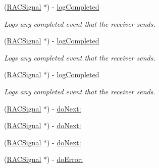 \begin{DoxyCompactItemize}
\mbox{\label{interface_r_a_c_signal_a1cacb34c4255d78ffdc38b38309112fe}} 
(\mbox{\hyperlink{interface_r_a_c_signal}{R\+A\+C\+Signal}} $\ast$) -\/ \mbox{\hyperlink{interface_r_a_c_signal_a1cacb34c4255d78ffdc38b38309112fe}{log\+Completed}}
\begin{DoxyCompactList}\small\item\em Logs any {\ttfamily completed} event that the receiver sends. \end{DoxyCompactList}\item 
\mbox{\label{interface_r_a_c_signal_a1cacb34c4255d78ffdc38b38309112fe}} 
(\mbox{\hyperlink{interface_r_a_c_signal}{R\+A\+C\+Signal}} $\ast$) -\/ \mbox{\hyperlink{interface_r_a_c_signal_a1cacb34c4255d78ffdc38b38309112fe}{log\+Completed}}
\begin{DoxyCompactList}\small\item\em Logs any {\ttfamily completed} event that the receiver sends. \end{DoxyCompactList}\item 
\mbox{\label{interface_r_a_c_signal_a1cacb34c4255d78ffdc38b38309112fe}} 
(\mbox{\hyperlink{interface_r_a_c_signal}{R\+A\+C\+Signal}} $\ast$) -\/ \mbox{\hyperlink{interface_r_a_c_signal_a1cacb34c4255d78ffdc38b38309112fe}{log\+Completed}}
\begin{DoxyCompactList}\small\item\em Logs any {\ttfamily completed} event that the receiver sends. \end{DoxyCompactList}\item 
(\mbox{\hyperlink{interface_r_a_c_signal}{R\+A\+C\+Signal}} $\ast$) -\/ \mbox{\hyperlink{interface_r_a_c_signal_a36028c2d987159f5210840358f4877c9}{do\+Next\+:}}
\item 
(\mbox{\hyperlink{interface_r_a_c_signal}{R\+A\+C\+Signal}} $\ast$) -\/ \mbox{\hyperlink{interface_r_a_c_signal_a36028c2d987159f5210840358f4877c9}{do\+Next\+:}}
\item 
(\mbox{\hyperlink{interface_r_a_c_signal}{R\+A\+C\+Signal}} $\ast$) -\/ \mbox{\hyperlink{interface_r_a_c_signal_a36028c2d987159f5210840358f4877c9}{do\+Next\+:}}
\item 
(\mbox{\hyperlink{interface_r_a_c_signal}{R\+A\+C\+Signal}} $\ast$) -\/ \mbox{\hyperlink{interface_r_a_c_signal_ac97a1fc7c03123a75746f2602b7444b4}{do\+Error\+:}}
\item 

\end{DoxyCompactItemize}
